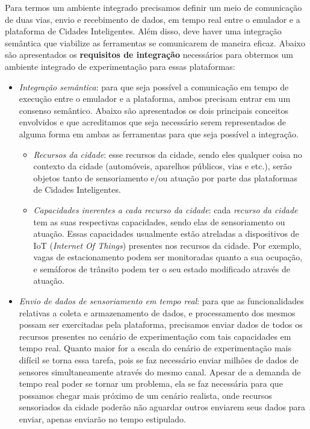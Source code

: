 Para termos um ambiente integrado precisamos definir um meio de comunicação de duas vias, envio e recebimento de dados, em tempo real entre o emulador e a plataforma de Cidades Inteligentes.
Além disso, deve haver uma integração semântica que viabilize as ferramentas se comunicarem de maneira eficaz.
Abaixo são apresentados os \textbf{requisitos de integração} necessários para obtermos um ambiente integrado de experimentação para essas plataformas:

\begin{itemize}
    \item \textit{Integração semântica}: para que seja possível a comunicação em tempo de execução entre o emulador e a plataforma, ambos precisam entrar em um consenso semântico.
        Abaixo são apresentados os dois principais conceitos envolvidos e que acreditamos que seja necessário serem representados de alguma forma em ambas as ferramentas para que seja
        possível a integração.

        \begin{itemize}
            \item \textit{Recursos da cidade}: esse recursos da cidade, sendo eles qualquer coisa no contexto da cidade (automóveis, aparelhos públicos, vias e etc.), serão objetos tanto de
                sensoriamento e/ou atuação por parte das plataformas de Cidades Inteligentes.

            \item \textit{Capacidades inerentes a cada recurso da cidade}: cada \textit{recurso da cidade} tem as suas respectivas capacidades, sendo elas de sensoriamento ou atuação.
                Essas capacidades usualmente estão atreladas a dispositivos de IoT (\textit{Internet Of Things}) presentes nos recursos da cidade.
                Por exemplo, vagas de estacionamento podem ser monitoradas quanto a sua ocupação, e semáforos de trânsito podem ter o seu estado modificado através de atuação.
        \end{itemize}

    \item \textit{Envio de dados de sensoriamento em tempo real}: para que as funcionalidades relativas a coleta e armazenamento de dados, e processamento dos mesmos possam ser
        exercitadas pela plataforma, precisamos enviar dados de todos os recursos presentes no cenário de experimentação com tais capacidades em tempo real.
        Quanto maior for a escala do cenário de experimentação mais difícil se torna essa tarefa, pois se faz necessário enviar milhões de dados de sensores simultaneamente através
        do mesmo canal.
        Apesar de a demanda de tempo real poder se tornar um problema, ela se faz necessária para que possamos chegar mais próximo de um cenário realista, onde recursos sensoriados
        da cidade poderão não aguardar outros enviarem seus dados para enviar, apenas enviarão no tempo estipulado.


\end{itemize}
